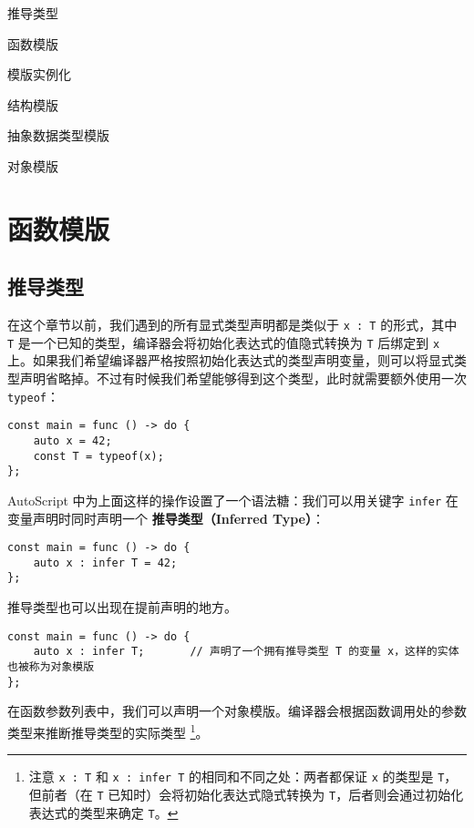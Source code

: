 \begin{introduction}
	\item 推导类型
	\item 函数模版
	\item 模版实例化
	\item 结构模版
	\item 抽象数据类型模版
	\item 对象模版
\end{introduction}

\section{函数模版}

\subsection{推导类型}

在这个章节以前，我们遇到的所有显式类型声明都是类似于 \lstinline!x : T! 的形式，其中 \lstinline!T! 是一个已知的类型，编译器会将初始化表达式的值隐式转换为 \lstinline!T! 后绑定到 \lstinline!x! 上。如果我们希望编译器严格按照初始化表达式的类型声明变量，则可以将显式类型声明省略掉。不过有时候我们希望能够得到这个类型，此时就需要额外使用一次 \lstinline!typeof!：

\begin{lstlisting}
const main = func () -> do {
	auto x = 42;
	const T = typeof(x);
};
\end{lstlisting}

AutoScript 中为上面这样的操作设置了一个语法糖：我们可以用关键字 \lstinline!infer! 在变量声明时同时声明一个 \textbf{推导类型（Inferred Type）}：

\begin{lstlisting}
const main = func () -> do {
	auto x : infer T = 42;
};
\end{lstlisting}

推导类型也可以出现在提前声明的地方。

\begin{lstlisting}
const main = func () -> do {
	auto x : infer T;		// 声明了一个拥有推导类型 T 的变量 x，这样的实体也被称为对象模版
};
\end{lstlisting}

在函数参数列表中，我们可以声明一个对象模版。编译器会根据函数调用处的参数类型来推断推导类型的实际类型 \footnote{注意 \lstinline!x : T! 和 \lstinline!x : infer T! 的相同和不同之处：两者都保证 \lstinline!x! 的类型是 \lstinline!T!，但前者（在 \lstinline!T! 已知时）会将初始化表达式隐式转换为 \lstinline!T!，后者则会通过初始化表达式的类型来确定 \lstinline!T!。}。

